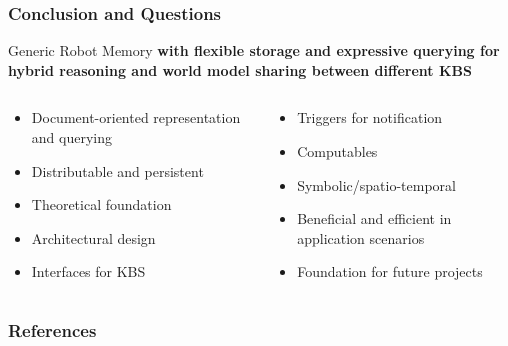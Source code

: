 \begin{frame}
  \frametitle{Conclusion and Questions}
  \begin{block}{Generic Robot Memory } \centering\bfseries
    with flexible storage and expressive querying for hybrid reasoning and world model sharing between different KBS
  \end{block}
  \bigskip
  \begin{columns}
    \begin{column}{0.5\textwidth}
      \begin{itemize}
      \item Document-oriented representation and querying
      \item Distributable and persistent
      \item Theoretical foundation
      \item Architectural design
      \item Interfaces for KBS
      \end{itemize}
    \end{column}
    \begin{column}{0.5\textwidth}
      \begin{itemize}
      \item Triggers for notification
      \item Computables
      \item Symbolic/spatio-temporal
      \item Beneficial and efficient in application scenarios
      \item Foundation for future projects
      \end{itemize}
    \end{column}
  \end{columns}
\end{frame}




\setcounter{finalframe}{\value{framenumber}}


\begin{frame}[allowframebreaks]
  \frametitle{References}
  \small
  
  
\end{frame}

